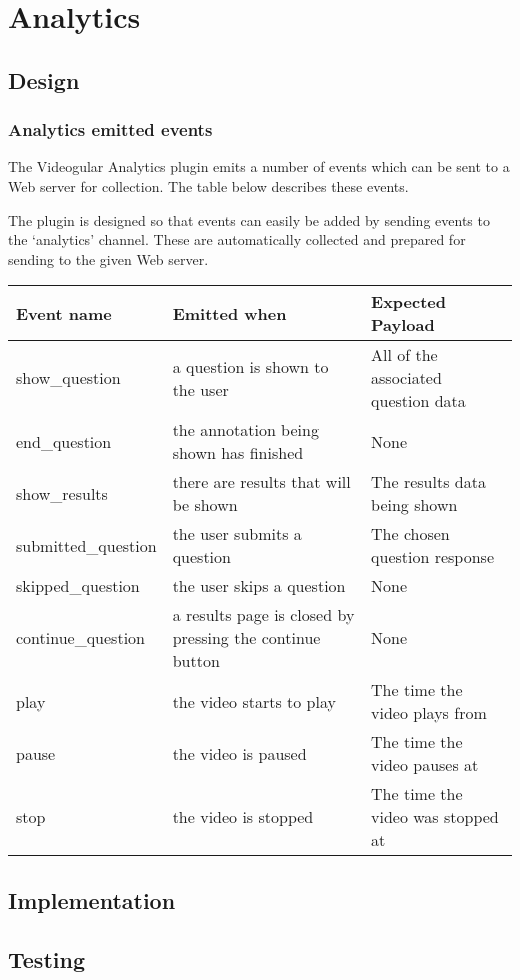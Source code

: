 \chapter{Analytics} \label{Chapter: Analytics}

\section{Design}

\subsection{Analytics emitted events}

The Videogular Analytics plugin emits a number of events which can be sent to a Web server for collection. The table below describes these events.

The plugin is designed so that events can easily be added by sending events to the `analytics' channel. These are automatically collected and prepared for sending to the given Web server.

\begin{tabular}{p{3.2cm} p{7cm} p{4cm}}

\textbf{Event name} & \textbf{Emitted when} & \textbf{Expected Payload} \\
\hline 
show\_question & a question is shown to the user & All of the associated question data \\
\hline 
end\_question & the annotation being shown has finished & None \\
\hline 
show\_results & there are results that will be shown & The results data being shown \\
\hline 
submitted\_question & the user submits a question & The chosen question response \\
\hline 
skipped\_question & the user skips a question & None \\
\hline 
continue\_question & a results page is closed by pressing the continue button & None \\
\hline 
play & the video starts to play & The time the video plays from \\
\hline 
pause & the video is paused & The time the video pauses at \\
\hline 
stop & the video is stopped & The time the video was stopped at \\
\end{tabular}

\section{Implementation}

\section{Testing}
